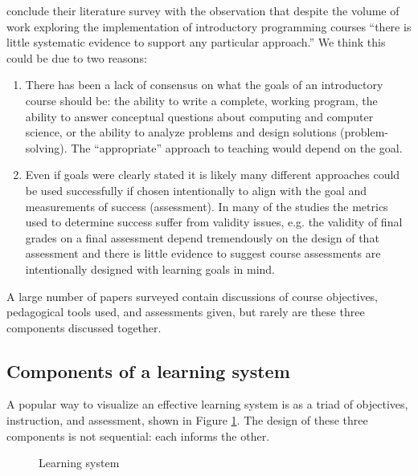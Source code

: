 \documentclass[12pt]{article}
\let\textcite=\autocite
\begin{document}
\citeauthor{pears_survey_2007-1} conclude their
\citeyear{pears_survey_2007-1} literature survey with the observation
that despite the volume of work exploring the implementation of
introductory programming courses “there is little systematic evidence
to support any particular approach.”\autocite{pears_survey_2007-1}
We think this could be due to two reasons:

\begin{enumerate}
\item There has been a lack of consensus on what the goals of an
  introductory course should be: the ability to write a complete,
  working program, the ability to answer conceptual questions about
  computing and computer science, or the ability to analyze problems
  and design solutions (problem-solving). The “appropriate” approach
  to teaching would depend on the goal.

\item Even if goals were clearly stated it is likely many different
  approaches could be used successfully if chosen intentionally to
  align with the goal and measurements of success (assessment). In
  many of the studies the metrics used to determine success suffer
  from validity issues, e.g. the validity of final grades on a final
  assessment depend tremendously on the design of that assessment and
  there is little evidence to suggest course assessments are
  intentionally designed with learning goals in mind.
\end{enumerate}

A large number of papers surveyed contain discussions of course
objectives, pedagogical tools used, and assessments given, but rarely
are these three components discussed together.

\subsection{Components of a learning
system}\label{sec:components-of-a-learning-system}

A popular way to visualize an effective learning system is as a triad
of objectives, instruction, and
assessment\textcite{felder_designing_2003}, shown in Figure
\ref{fig:learning-system}. The design of these three components is not
sequential: each informs the other.

\begin{figure}[h!]
  \centering
  \caption{Learning system}
  \label{fig:learning-system}
\end{figure}
\end{document}
